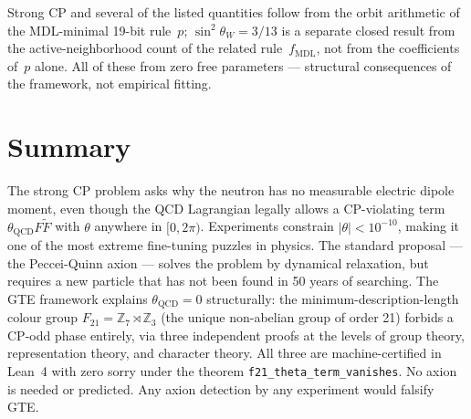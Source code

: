 \documentclass[11pt,a4paper]{article}
\newcommand{\lean}[1]{\texttt{#1}}
\begin{document}
Strong CP and several of the listed quantities follow from the orbit arithmetic of the MDL-minimal 19-bit rule~$p$; $\sin^2\theta_W = 3/13$ is a separate closed result from the active-neighborhood count of the related rule~$f_{\mathrm{MDL}}$, not from the coefficients of~$p$ alone.  All of these from zero free parameters --- structural consequences of the framework, not empirical fitting.

\section{Summary}

\begin{tcolorbox}[colback=boxblue,colframe=blue!40!black,title=Everything in one paragraph]
The strong CP problem asks why the neutron has no measurable electric dipole moment, even though the QCD Lagrangian legally allows a CP-violating term $\theta_{\mathrm{QCD}} F\tilde{F}$ with $\theta$ anywhere in $[0, 2\pi)$.  Experiments constrain $|\theta| < 10^{-10}$, making it one of the most extreme fine-tuning puzzles in physics.  The standard proposal --- the Peccei-Quinn axion --- solves the problem by dynamical relaxation, but requires a new particle that has not been found in 50 years of searching.  The GTE framework explains $\theta_{\mathrm{QCD}} = 0$ structurally: the minimum-description-length colour group $F_{21} = \mathbb{Z}_7 \rtimes \mathbb{Z}_3$ (the unique non-abelian group of order 21) forbids a CP-odd phase entirely, via three independent proofs at the levels of group theory, representation theory, and character theory.  All three are machine-certified in Lean~4 with zero sorry under the theorem \lean{f21\_theta\_term\_vanishes}.  No axion is needed or predicted.  Any axion detection by any experiment would falsify GTE.
\end{tcolorbox}

\bigskip
\end{document}
